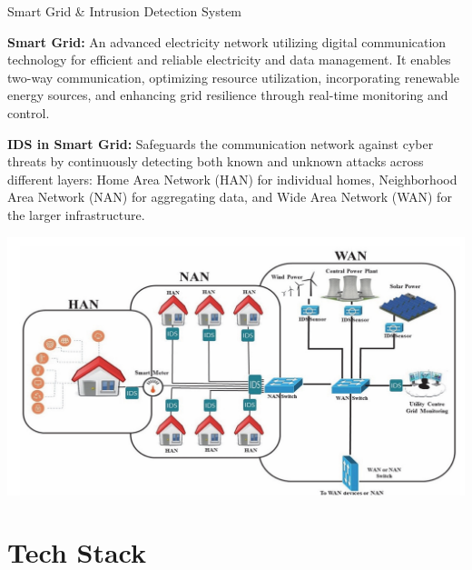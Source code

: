 \documentclass{beamer}
\begin{document}
\begin{frame}{Smart Grid \& Intrusion Detection System}
\begin{minipage}{0.6\textwidth}
\textbf{Smart Grid:} An advanced electricity network utilizing digital communication technology for efficient and reliable electricity and data management. It enables two-way communication, optimizing resource utilization, incorporating renewable energy sources, and enhancing grid resilience through real-time monitoring and control.
\par \textbf{IDS in Smart Grid:} Safeguards the communication network against cyber threats by continuously detecting both known and unknown attacks across different layers: Home Area Network (HAN) for individual homes, Neighborhood Area Network (NAN) for aggregating data, and Wide Area Network (WAN) for the larger infrastructure.
\end{minipage}%
\begin{minipage}{0.4\textwidth}
\includegraphics[width=\textwidth]{images/arch.png}
\end{minipage}
\end{frame}

\section{Tech Stack}
\end{document}
